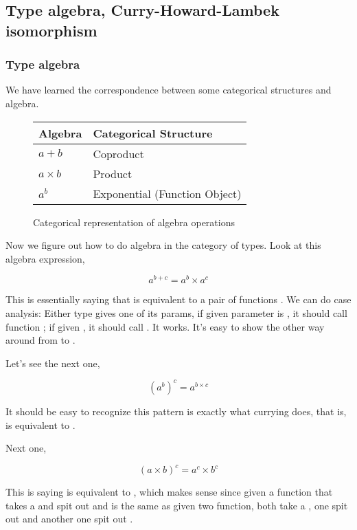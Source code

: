 
\setcounter{section}{8}
\setcounter{subsection}{1}
\subsection{Type algebra, Curry-Howard-Lambek isomorphism}

\subsubsection{Type algebra}

We have learned the correspondence between some categorical structures and
algebra.

\begin{figure}[h]
\centering
\begin{tabular}{ll}
\hline
Algebra      & Categorical Structure         \\ \hline
$a + b$      & Coproduct                     \\
$a \times b$ & Product                       \\
$a^b$        & Exponential (Function Object) \\ \hline
\end{tabular}
\caption{Categorical representation of algebra operations}
\end{figure}

Now we figure out how to do algebra in the category of types. Look at this
algebra expression,

\[
  a^{b+c} = a^b \times a^c
\]

This is essentially saying that  is equivalent to a pair
of functions . We can do case analysis: Either type gives
one of its params, if given parameter is , it should call function
; if given , it should call . It works. It's
easy to show the other way around from  to .

Let's see the next one,

\[
  (a^b)^c = a^{b\times c}
\]

It should be easy to recognize this pattern is exactly what currying does, that
is,  is equivalent to .

Next one,

\[
  (a\times b)^c = a^c\times b^c
\]

This is saying  is equivalent to , which
makes sense since given a function that takes a  and spit out 
and  is the same as given two function, both take a , one spit
out  and another one spit out .


